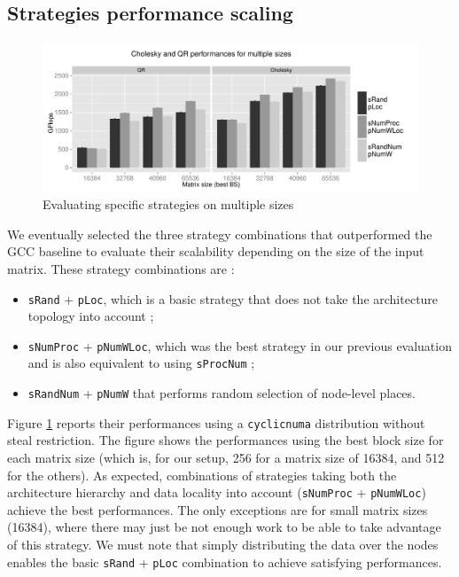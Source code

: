 \documentclass{Styles/llncs}
\begin{document}
\subsection{Strategies performance scaling}

\begin{figure}[t]
  \centering
  \includegraphics[scale=0.5]{figures/graph_details_strat.pdf}
\caption{Evaluating specific strategies on multiple sizes}
\label{fig:eval-strat-sizes}
\end{figure}

We eventually selected the three strategy combinations that outperformed the GCC baseline to evaluate their scalability depending on the size of the input matrix.
These strategy combinations are :
\begin{itemize}
  \item \verb/sRand/ + \verb/pLoc/, which is a basic strategy that does not take the architecture topology into account ;
  \item \verb/sNumProc/ + \verb/pNumWLoc/, which was the best strategy in our previous
    evaluation and is also equivalent to using \verb/sProcNum/ ;
  \item \verb/sRandNum/ + \verb/pNumW/ that performs random selection of node-level places.
\end{itemize}

Figure \ref{fig:eval-strat-sizes} reports their performances using a \verb/cyclicnuma/ distribution without steal restriction.
The figure shows the performances using the best block size for each matrix size (which is, for our setup, 256 for a matrix
size of 16384, and 512 for the others).
As expected, combinations of strategies taking both the architecture hierarchy and data locality into account (\verb/sNumProc/
+ \verb/pNumWLoc/) achieve the best performances.
The only exceptions are for small matrix sizes (16384), where there may just be
not enough work to be able to take advantage of this strategy.
We must note that simply distributing the data over the nodes enables the basic
\verb/sRand/ + \verb/pLoc/ combination to achieve satisfying performances.
\end{document}
